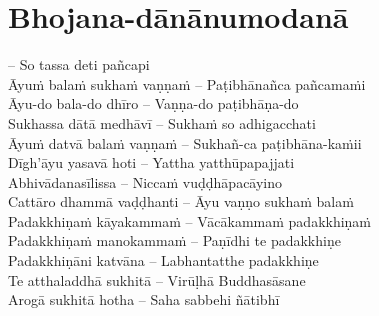 
\section{Bhojana-dānānumodanā}

\begin{twochants}
   – So tassa deti pañcapi\\
  Āyuṁ balaṁ sukhaṁ vaṇṇaṁ – Paṭibhānañca pañcamaṁi\\
  Āyu-do bala-do dhīro – Vaṇṇa-do paṭibhāṇa-do\\
  Sukhassa dātā medhāvī – Sukhaṁ so adhigacchati\\
  Āyuṁ datvā balaṁ vaṇṇaṁ – Sukhañ-ca paṭibhāna-kaṁii\\
  Dīgh’āyu yasavā hoti – Yattha yatthūpapajjati\\
  Abhivādanasīlissa – Niccaṁ vuḍḍhāpacāyino\\
  Cattāro dhammā vaḍḍhanti – Āyu vaṇṇo sukhaṁ balaṁ\\
  Padakkhiṇaṁ kāyakammaṁ – Vācākammaṁ padakkhiṇaṁ\\
  Padakkhiṇaṁ manokammaṁ – Paṇīdhi te padakkhiṇe\\
  Padakkhiṇāni katvāna – Labhantatthe padakkhiṇe\\
  Te atthaladdhā sukhitā – Virūḷhā Buddhasāsane\\
  Arogā sukhitā hotha – Saha sabbehi ñātibhī
\end{twochants}

\bigskip

